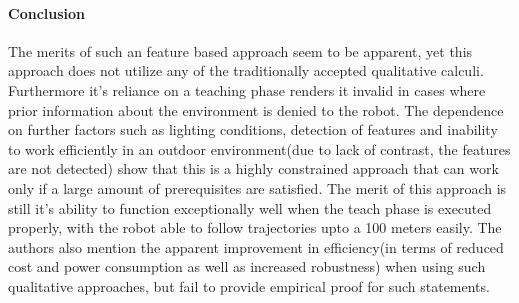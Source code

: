 \begin{itemize}
	\paragraph{Conclusion}The merits of such an feature based approach seem to be apparent, yet this approach does not utilize any of the traditionally accepted qualitative calculi. Furthermore it's reliance on a teaching phase renders it invalid in cases where prior information about the environment is denied to the robot. The dependence on further factors such as lighting conditions, detection of features and inability to work efficiently in an outdoor environment(due to lack of contrast, the features are not detected) show that this is a highly constrained approach that can work only if a large amount of prerequisites are satisfied. The merit of this approach is still it's ability to function exceptionally well when the teach phase is executed properly, with the robot able to follow trajectories upto a 100 meters easily. The authors also mention the apparent improvement in efficiency(in terms of 	reduced cost and power consumption as well as increased robustness) when using such qualitative approaches,  but fail to provide empirical proof for such statements.
	

\end{itemize}
